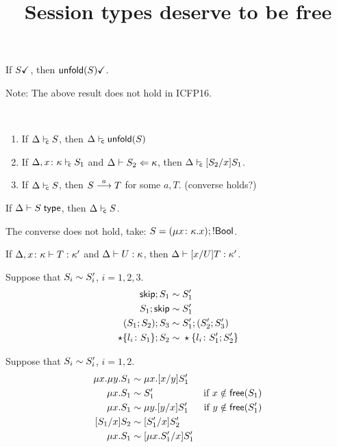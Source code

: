 \documentclass{article}
\title{Session types deserve to be free}
\begin{document}



\begin{lemma}
  If $\done S$, then $\done{\unfoldk(S)}$.  
\end{lemma}

Note: The above result does not hold in ICFP16.

\begin{lemma}\
  \begin{enumerate}
  \item If $\isContr S$, then $\isContr{\unfoldk(S)}$
  \item If $\isContr[\Delta,x\colon\kind]{S_1}$ and $\algkindin {S_2} \kind$,
    then $\isContr{\subs{S_2}{x}{S_1}}$.
  \item If $\isContr S$, then $S \LTSderives T$ for some $a,T$. (converse holds?)
  \end{enumerate}
\end{lemma}

\begin{lemma}
	If $\isTypeNoKind S$, then $\isContr S$.
\end{lemma}

The converse does not hold, take: $S = (\rect{x\colon\kind} x); !\boolt$.




\begin{lemma}
  If $\isType[\Delta,x\colon\kind] T\kind'$ and $\isType U\kind$, then
  $\isType{\subs xUT}{\kind'}$.
\end{lemma}


\begin{lemma}
  \label{lemma:seq-laws}
  Suppose that $S_i \TypeEquiv S'_i$, $i=1,2,3$.
  \begin{align*}
    \skipk;S_1 \TypeEquiv&\; S'_1
    \\
    S_1;\skipk \TypeEquiv&\; S_1'
    \\
    (S_1;S_2);S_3 \TypeEquiv&\; S'_1;(S'_2;S'_3)
    \\
    \star\{l_i\colon S_1\};S_2 \TypeEquiv&\; \star\{l_i\colon S'_1;S'_2\}
  \end{align*}
\end{lemma}

\begin{lemma}
\label{lemma:mu-laws}
  Suppose that $S_i \TypeEquiv S'_i$, $i=1,2$.
  \begin{align*}
    \mu x. \mu y. S_1 \TypeEquiv&\; \mu x. \subs xy{S_1'}
    \\
    \mu x.S_1 \TypeEquiv&\; S'_1 &\text{if } x \notin \free (S_1)
    \\
    \mu x.S_1 \TypeEquiv&\; \mu y.\subs yx{S_1'} &\text{if } y \notin \free (S'_1)
    \\
    \subs{S_1}{x}{S_2} \TypeEquiv&\; \subs{S_1'}{x}{S_2'}
    \\
    \mu x.S_1 \TypeEquiv&\; \subs{\mu x.S_1'}{x}{S_1'}
  \end{align*}
\end{lemma}




% 
% 
\end{document}
